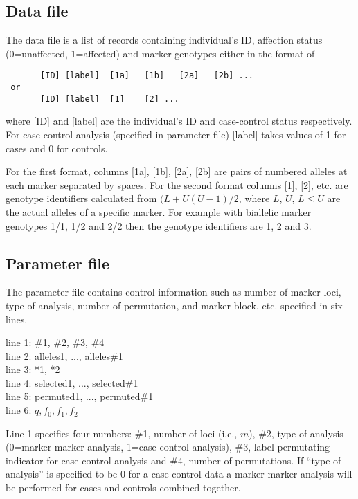\documentclass[11pt]{article}
\begin{document}
\subsection{Data file}

The data file is a list of records containing individual's ID, affection status
(0=unaffected, 1=affected) and marker genotypes either in the format of

\begin{verbatim}
       [ID] [label]  [1a]   [1b]   [2a]   [2b] ...
 or
       [ID] [label]  [1]    [2] ...
\end{verbatim}

\noindent where [ID] and [label] are the individual's ID and case-control status
respectively.  For case-control analysis (specified in parameter file) [label]
takes values of 1 for cases and 0 for controls.

For the first format, columns [1a], [1b], [2a], [2b] are pairs of numbered
alleles at each marker separated by spaces.  For the second format columns
[1], [2], etc.  are genotype identifiers calculated from $(L+U(U-1)/2$,
where $L$, $U$, $L\leq U$ are the actual alleles of a specific marker.
For example with biallelic marker genotypes 1/1, 1/2 and 2/2 then the
genotype identifiers are 1, 2 and 3.

\subsection{Parameter file}

The parameter file contains control information such as number of marker loci,
type of analysis, number of permutation, and marker block, etc. specified in
six lines.

{\small
\medskip\noindent
line 1: \#1, \#2, \#3, \#4\\
line 2: alleles1, ..., alleles\#1\\
line 3: *1, *2\\
line 4: selected1, ..., selected\#1\\
line 5: permuted1, ..., permuted\#1\\
line 6: $q, f_0, f_1, f_2$\\
}

\noindent Line 1 specifies four numbers:  \#1, number of loci (i.e., $m$),
\#2, type of analysis (0=marker-marker analysis, 1=case-control analysis),
\#3, label-permutating indicator for case-control analysis and \#4, number
of permutations.  If ``type of analysis'' is specified to be 0 for a
case-control data a marker-marker analysis will be performed for cases and
controls combined together.
\end{document}
